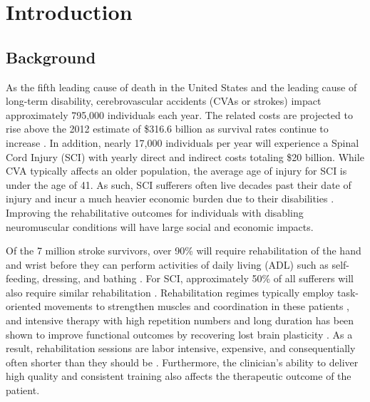
\chapter{Introduction}\label{ch:Intro}


   \section{Background} \label{sec:background}

    As the fifth leading cause of death in the United States and the leading cause of long-term disability, cerebrovascular accidents (CVAs or strokes) impact approximately 795,000 individuals each year. The related costs are projected to rise above the 2012 estimate of \$316.6 billion as survival rates continue to increase \cite{mozaffarian2015}. In addition, nearly 17,000 individuals per year will experience a Spinal Cord Injury (SCI) with yearly direct and indirect costs totaling \$20 billion. While CVA typically affects an older population, the average age of injury for SCI is under the age of 41. As such, SCI sufferers often live decades past their date of injury and incur a much heavier economic burden due to their disabilities \cite{berkowitz1998}. Improving the rehabilitative outcomes for individuals with disabling neuromuscular conditions will have large social and economic impacts.

    Of the 7 million stroke survivors, over 90\% will require rehabilitation of the hand and wrist before they can perform activities of daily living (ADL) such as self-feeding, dressing, and bathing \cite{mozaffarian2015}. For SCI, approximately 50\% of all sufferers will also require similar rehabilitation \cite{steeves2007}. Rehabilitation regimes typically employ task-oriented movements to strengthen muscles and coordination in these patients \cite{riener2005}, and intensive therapy with high repetition numbers and long duration has been shown to improve functional outcomes by recovering lost brain plasticity \cite{butefisch1995}. As a result, rehabilitation sessions are labor intensive, expensive, and consequentially often shorter than they should be \cite{nef2007}. Furthermore, the clinician's ability to deliver high quality and consistent training also affects the therapeutic outcome of the patient.

